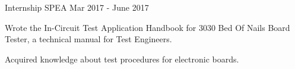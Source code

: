\begin{cventries}
  \cventry
    {Internship}
    {SPEA}
    {Mar 2017 - June 2017}
    {}
    {
      \begin{cvitems}
        \item {Wrote the In-Circuit Test Application Handbook for 3030 Bed Of Nails Board Tester, a technical manual for Test Engineers.}
        \item {Acquired knowledge about test procedures for electronic boards.}
      \end{cvitems}
    }

\end{cventries}
